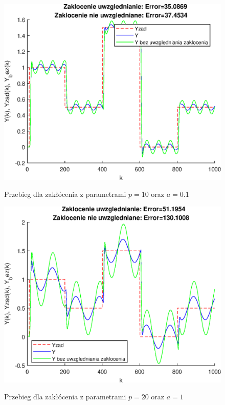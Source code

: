 \begin{figure}[h!]
	\centering
	\includegraphics[scale=1]{Rys/sin10_10}
	\label{fig:sin10_10}
	\caption{Przebieg dla zakłócenia z parametrami $p=10$ oraz $a=0.1$}
\end{figure}
\begin{figure}[h!]
	\centering
	\includegraphics[scale=1]{Rys/sin20_1}
	\label{fig:sin20_1}
	\caption{Przebieg dla zakłócenia z parametrami $p=20$ oraz $a=1$}
\end{figure}
